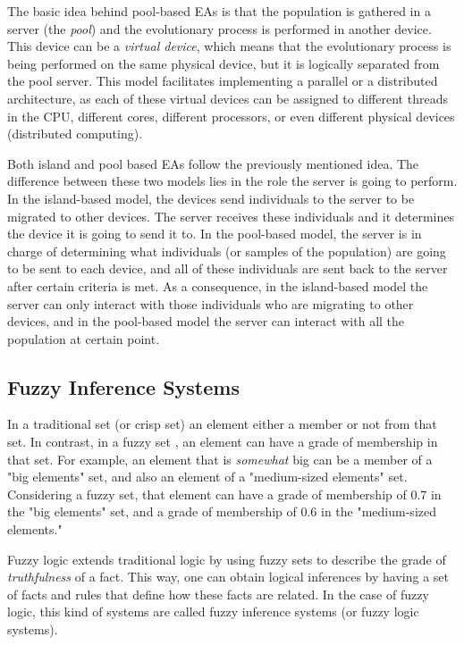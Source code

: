 The basic idea behind pool-based EAs is that the population is gathered in a server (the \textit{pool}) and the evolutionary process is performed in another device. This device can be a \textit{virtual device}, which means that the evolutionary process is being performed on the same physical device, but it is logically separated from the pool server. This model facilitates implementing a parallel or a distributed architecture, as each of these virtual devices can be assigned to different threads in the CPU, different cores, different processors, or even different physical devices (distributed computing).

Both island and pool based EAs follow the previously mentioned idea. The difference between these two models lies in the role the server is going to perform. In the island-based model, the devices send individuals to the server to be migrated to other devices. The server receives these individuals and it determines the device it is going to send it to. In the pool-based model, the server is in charge of determining what individuals (or samples of the population) are going to be sent to each device, and all of these individuals are sent back to the server after certain criteria is met. As a consequence, in the island-based model the server can only interact with those individuals who are migrating to other devices, and in the pool-based model the server can interact with all the population at certain point.

\subsection{Fuzzy Inference Systems}
\label{fuzzy-inference-systems}

In a traditional set (or crisp set) an element either a member or not from that set. In contrast, in a fuzzy set \cite{zadeh1965fuzzy}, an element can have a grade of membership in that set. For example, an element that is \textit{somewhat} big can be a member of a "big elements" set, and also an element of a "medium-sized elements" set. Considering a fuzzy set, that element can have a grade of membership of 0.7 in the "big elements" set, and a grade of membership of 0.6 in the "medium-sized elements."

Fuzzy logic \cite{zadeh1988fuzzy} extends traditional logic by using fuzzy sets to describe the grade of \textit{truthfulness} of a fact. This way, one can obtain logical inferences by having a set of facts and rules that define how these facts are related. In the case of fuzzy logic, this kind of systems are called fuzzy inference systems (or fuzzy logic systems).

